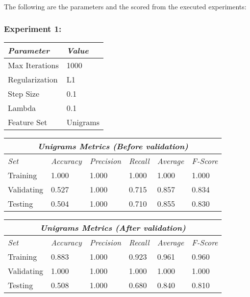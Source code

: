 \documentclass[11pt]{article}
\begin{document}
The following are the parameters and the scored from the executed experiments:



\clearpage
\subsubsection*{Experiment 1:}

\begin{table}[H]
\centering
\begin{tabular}{ |p{3cm}||p{2cm}|  }
 \hline
 \textit{Parameter} & \textit{Value} \\
 \hline
 Max Iterations   & 1000 \\
 Regularization & L1 \\
 Step Size    & 0.1 \\
 Lambda    & 0.1 \\
 Feature Set    & Unigrams \\
 \hline
\end{tabular}
\end{table}

\begin{table}[H]
\centering
\begin{tabular}{ |p{2cm}||p{2cm}|p{2cm}|p{2cm}|p{2cm}|p{2cm}|  }
 \hline
 \multicolumn{6}{|c|}{\textbf{\textit{Unigrams Metrics (Before validation)}}} \\
 \hline
 \textit{Set} & \textit{Accuracy} & \textit{Precision} & \textit{Recall} & \textit{Average} & \textit{F-Score} \\
 \hline
 Training   & 1.000 & 1.000 & 1.000 & 1.000 & 1.000 \\
 Validating & 0.527 & 1.000 & 0.715 & 0.857 & 0.834 \\
 Testing    & 0.504 & 1.000 & 0.710 & 0.855 & 0.830 \\
 \hline
\end{tabular}
\end{table}

\begin{table}[H]
\centering
\begin{tabular}{ |p{2cm}||p{2cm}|p{2cm}|p{2cm}|p{2cm}|p{2cm}|  }
 \hline
 \multicolumn{6}{|c|}{\textbf{\textit{Unigrams Metrics (After validation)}}} \\
 \hline
 \textit{Set} & \textit{Accuracy} & \textit{Precision} & \textit{Recall} & \textit{Average} & \textit{F-Score} \\
 \hline
 Training   & 0.883 & 1.000 & 0.923 & 0.961 & 0.960 \\
 Validating & 1.000 & 1.000 & 1.000 & 1.000 & 1.000 \\
 Testing    & 0.508 & 1.000 & 0.680 & 0.840 & 0.810 \\
 \hline
\end{tabular}
\end{table}
\end{document}
